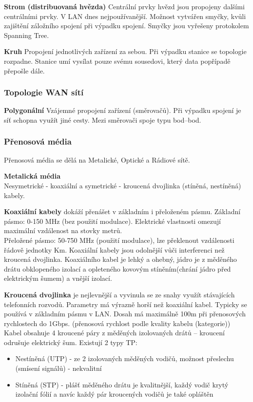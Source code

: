 \textbf{Strom (distribuovaná hvězda)} Centrální prvky hvězd jsou propojeny dalšími centrálními prvky. V LAN dnes nejpoužívanější. Možnost vytvářen smyčky, kvůli zajištění záložního spojení při výpadku spojení. Smyčky jsou vyřešeny protokolem Spanning Tree.

\textbf{Kruh} Propojení jednotlivých zařízení za sebou. Při výpadku stanice se topologie rozpadne. Stanice umí vysílat pouze svému sousedovi, který data popřípadě přepošle dále.

\subsubsection{Topologie WAN sítí}
\textbf{Polygonální} Vzájemné propojení zařízení (směrovačů). Při výpadku spojení je síť schopna využít jiné cesty. Mezi směrovači spoje typu bod--bod.

\subsubsection{Přenosová média}
Přenosová média se dělá na Metalické, Optické a Rádiové sítě.

\textbf{Metalická média}\\
Nesymetrické - koaxiální a symetrické - kroucená dvojlinka (stíněná, nestíněná) kabely.

\textbf{Koaxiální kabely} dokáží přenášet v základním i přeloženém pásmu. Základní pásmo: 0-150 MHz (bez použití modulace). Elektrické vlastnosti omezují maximální vzdálenost na stovky metrů.
\\Přeložené pásmo: 50-750 MHz (použití modulace), lze překlenout vzdálenosti řádově jednotky Km.
Koaxiální kabely jsou odolnější vůči interferenci než kroucená dvojlinka. Koaxiálního kabel je lehký a ohebný, jádro je z měděného drátu obklopeného izolací a opleteného kovovým stíněním(chrání jádro před elektrickým šumem) a vnější izolací.

\textbf{Kroucená dvojlinka}  je nejlevnější a vyvinula se ze snahy využít stávajících telefonních rozvodů. Parametry má výrazně horší než koaxiální kabel. Typicky se používá  v základním pásmu v LAN. Dosah má maximálně 100m při přenosových rychlostech do 1Gbps. (přenosová rychlost podle kvality kabelu (kategorie)) Kabel obsahuje 4 kroucené páry z měděných izolovaných drátů -- kroucení odrušuje elektrický šum. Existují 2 typy TP:
\begin{itemize}
\item Nestíněná (UTP) - ze 2 izolovaných měděných vodičů, možnost přeslechu (smísení signálů) - nekvalitní
\item Stíněná (STP) - plášť měděného drátu je kvalitnější, každý vodič krytý izolační fólií a navíc každý pár kroucených vodičů je také opláštěn
\end{itemize}

